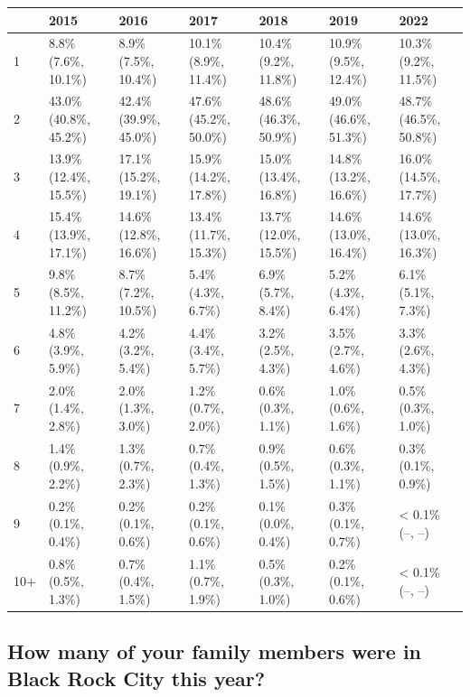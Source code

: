 \documentclass[
]{book}
\begin{document}
\begin{table}
\centering
\begin{tabular}[t]{>{}l|>{}l|>{}l|>{}l|>{}l|>{}l|>{}l}
\hline
  & 2015 & 2016 & 2017 & 2018 & 2019 & 2022\\
\hline
1 & 8.8\% (7.6\%, 10.1\%) & 8.9\% (7.5\%, 10.4\%) & 10.1\% (8.9\%, 11.4\%) & 10.4\% (9.2\%, 11.8\%) & 10.9\% (9.5\%, 12.4\%) & 10.3\% (9.2\%, 11.5\%)\\
\hline
2 & 43.0\% (40.8\%, 45.2\%) & 42.4\% (39.9\%, 45.0\%) & 47.6\% (45.2\%, 50.0\%) & 48.6\% (46.3\%, 50.9\%) & 49.0\% (46.6\%, 51.3\%) & 48.7\% (46.5\%, 50.8\%)\\
\hline
3 & 13.9\% (12.4\%, 15.5\%) & 17.1\% (15.2\%, 19.1\%) & 15.9\% (14.2\%, 17.8\%) & 15.0\% (13.4\%, 16.8\%) & 14.8\% (13.2\%, 16.6\%) & 16.0\% (14.5\%, 17.7\%)\\
\hline
4 & 15.4\% (13.9\%, 17.1\%) & 14.6\% (12.8\%, 16.6\%) & 13.4\% (11.7\%, 15.3\%) & 13.7\% (12.0\%, 15.5\%) & 14.6\% (13.0\%, 16.4\%) & 14.6\% (13.0\%, 16.3\%)\\
\hline
5 & 9.8\% (8.5\%, 11.2\%) & 8.7\% (7.2\%, 10.5\%) & 5.4\% (4.3\%, 6.7\%) & 6.9\% (5.7\%, 8.4\%) & 5.2\% (4.3\%, 6.4\%) & 6.1\% (5.1\%, 7.3\%)\\
\hline
6 & 4.8\% (3.9\%, 5.9\%) & 4.2\% (3.2\%, 5.4\%) & 4.4\% (3.4\%, 5.7\%) & 3.2\% (2.5\%, 4.3\%) & 3.5\% (2.7\%, 4.6\%) & 3.3\% (2.6\%, 4.3\%)\\
\hline
7 & 2.0\% (1.4\%, 2.8\%) & 2.0\% (1.3\%, 3.0\%) & 1.2\% (0.7\%, 2.0\%) & 0.6\% (0.3\%, 1.1\%) & 1.0\% (0.6\%, 1.6\%) & 0.5\% (0.3\%, 1.0\%)\\
\hline
8 & 1.4\% (0.9\%, 2.2\%) & 1.3\% (0.7\%, 2.3\%) & 0.7\% (0.4\%, 1.3\%) & 0.9\% (0.5\%, 1.5\%) & 0.6\% (0.3\%, 1.1\%) & 0.3\% (0.1\%, 0.9\%)\\
\hline
9 & 0.2\% (0.1\%, 0.4\%) & 0.2\% (0.1\%, 0.6\%) & 0.2\% (0.1\%, 0.6\%) & 0.1\% (0.0\%, 0.4\%) & 0.3\% (0.1\%, 0.7\%) & < 0.1\% (--, --)\\
\hline
10+ & 0.8\% (0.5\%, 1.3\%) & 0.7\% (0.4\%, 1.5\%) & 1.1\% (0.7\%, 1.9\%) & 0.5\% (0.3\%, 1.0\%) & 0.2\% (0.1\%, 0.6\%) & < 0.1\% (--, --)\\
\hline
\end{tabular}
\end{table}

\hypertarget{how-many-of-your-family-members-were-in-black-rock-city-this-year}{%
\subsection{How many of your family members were in Black Rock City this year?}\label{how-many-of-your-family-members-were-in-black-rock-city-this-year}}
\end{document}
